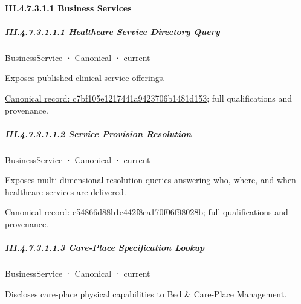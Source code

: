 \paragraph*{III.4.7.3.1.1 Business Services}
\label{navigation:III.4.7.3.1.1}

\subparagraph*{III.4.7.3.1.1.1 Healthcare Service Directory Query}
\label{navigation:III.4.7.3.1.1.1}

\label{element:c7bf105e1217441a9423706b1481d153}
{\small BusinessService · Canonical · current}\par

Exposes published clinical service offerings.


{\footnotesize \href{../../../../../../../continuum/business/business-service/c7bf105e1217441a9423706b1481d153.md}{Canonical record: c7bf105e1217441a9423706b1481d153}; full qualifications and provenance.}\par
\subparagraph*{III.4.7.3.1.1.2 Service Provision Resolution}
\label{navigation:III.4.7.3.1.1.2}

\label{element:e54866d88b1e442f8ea170f06f98028b}
{\small BusinessService · Canonical · current}\par

Exposes multi-dimensional resolution queries answering who, where, and when healthcare services are delivered.


{\footnotesize \href{../../../../../../../continuum/business/business-service/e54866d88b1e442f8ea170f06f98028b.md}{Canonical record: e54866d88b1e442f8ea170f06f98028b}; full qualifications and provenance.}\par
\subparagraph*{III.4.7.3.1.1.3 Care-Place Specification Lookup}
\label{navigation:III.4.7.3.1.1.3}

\label{element:43b011b0c233408eaf6e555ecbf05d9e}
{\small BusinessService · Canonical · current}\par

Discloses care-place physical capabilities to Bed \& Care-Place Management.


